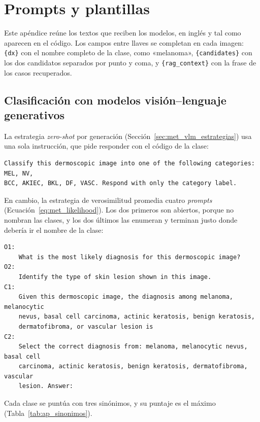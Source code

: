 \chapter{Prompts y plantillas}
\label{ap:prompts}

Este apéndice reúne los textos que reciben los modelos, en inglés y tal como aparecen en el código. Los campos
entre llaves se completan en cada imagen: \texttt{\{dx\}} con el nombre completo de la clase, como
«melanoma», \texttt{\{candidates\}} con los dos candidatos separados por punto y coma, y
\texttt{\{rag\_context\}} con la frase de los casos recuperados.

\section{Clasificación con modelos visión--lenguaje generativos}

La estrategia \emph{zero-shot} por generación (Sección~\ref{sec:met_vlm_estrategias}) usa una sola instrucción,
que pide responder con el código de la clase:
\begin{verbatim}
Classify this dermoscopic image into one of the following categories: MEL, NV,
BCC, AKIEC, BKL, DF, VASC. Respond with only the category label.
\end{verbatim}

En cambio, la estrategia de verosimilitud promedia cuatro \emph{prompts} (Ecuación~\ref{eq:met_likelihood}). Los
dos primeros son abiertos, porque no nombran las clases, y los dos últimos las enumeran y terminan justo donde
debería ir el nombre de la clase:
\begin{verbatim}
O1:
    What is the most likely diagnosis for this dermoscopic image?
O2:
    Identify the type of skin lesion shown in this image.
C1:
    Given this dermoscopic image, the diagnosis among melanoma, melanocytic
    nevus, basal cell carcinoma, actinic keratosis, benign keratosis,
    dermatofibroma, or vascular lesion is
C2:
    Select the correct diagnosis from: melanoma, melanocytic nevus, basal cell
    carcinoma, actinic keratosis, benign keratosis, dermatofibroma, vascular
    lesion. Answer:
\end{verbatim}
Cada clase se puntúa con tres sinónimos, y su puntaje es el máximo (Tabla~\ref{tab:ap_sinonimos}).

